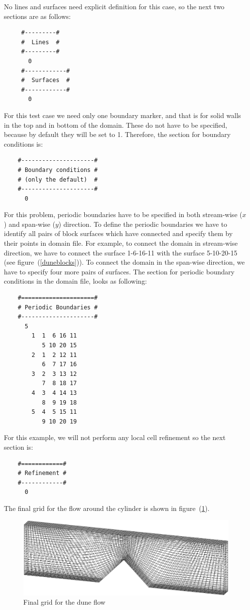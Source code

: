\documentclass[10pt]{article}
\begin{document}
    No lines and surfaces need explicit definition for this case,
    so the next two sections are as follows:
     \small
     \begin{verbatim}
     #---------#
     #  Lines  #
     #---------#
       0
     #------------#
     #  Surfaces  #
     #------------#
       0
     \end{verbatim}
     \normalsize
    For this test case we need only one boundary marker, and that
    is for solid walls in the top and in bottom of the domain. These 
    do not have to be specified, because by default they will be set to
    1. Therefore, the section for boundary conditions is:
    \small
    \begin{verbatim}
    #---------------------#
    # Boundary conditions #
    # (only the default)  #
    #---------------------#
      0
    \end{verbatim}
    \normalsize
    For this problem, periodic boundaries have to be specified 
    in both stream-wise ($x$)
    and span-wise ($y$) direction. To define the periodic boundaries
    we have to identify all pairs of block surfaces which have 
    connected and specify them by their points in domain file.
    For example, to connect the domain in stream-wise direction,
    we have to connect the surface \mbox{1-6-16-11} with the surface
    \mbox{5-10-20-15} (see figure~(\ref{duneblocks})). 
    To connect the domain in the span-wise 
    direction, we have to specify four more pairs of surfaces.
    The section for periodic boundary conditions in the domain
    file, looks as following:  
    \small
    \begin{verbatim}
    #=====================#
    # Periodic Boundaries #
    #---------------------#
      5
        1  1  6 16 11
           5 10 20 15
        2  1  2 12 11
           6  7 17 16
        3  2  3 13 12
           7  8 18 17
        4  3  4 14 13
           8  9 19 18
        5  4  5 15 11
           9 10 20 19  
    \end{verbatim}
    \normalsize
    For this example, we will not perform any local cell refinement
    so the next section is:
    \small
    \begin{verbatim}
    #============#
    # Refinement #
    #------------#
      0
    \end{verbatim}
    \normalsize
    The final grid for the flow around the cylinder is shown in
    figure~(\ref{dunefinal_p10_m30_p10}).
    \begin{figure}
    \centering
    \includegraphics[scale=0.6]{dunefinal_p10_m30_p10.eps}
    \caption{Final grid for the dune flow}
    \label{dunefinal_p10_m30_p10}
    \end{figure}
\end{document}
